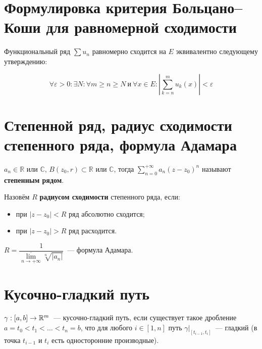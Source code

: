 \documentclass{article}
\begin{document}
    \newpage
    
    \section{Формулировка критерия Больцано--Коши для равномерной сходимости}
    
        Функциональный ряд $\sum u_n$ равномерно сходится на $E$ эквивалентно следующему утверждению:
        
        $$\forall \varepsilon > 0 : \exists N : \forall m \geq n \geq N \ \textrm{и} \ \forall x \in E : \left| \sum\limits^m_{k = n} u_k(x) \right| < \varepsilon$$
        
    \newpage
    
    \section{Степенной ряд, радиус сходимости степенного ряда, формула Адамара}
    
        $a_n \in \mathbb{R}$ или $\mathbb{C}$, $B(z_0, r) \subset \mathbb{R}$ или $\mathbb{C}$, тогда $\sum\limits^{+\infty}_{n = 0} a_n (z - z_0)^n$ называют \textbf{степенным рядом}.
        
        Назовём $R$ \textbf{радиусом сходимости} степенного ряда, если:
        
            \begin{itemize}
            
                \item при $|z - z_0| < R$ ряд абсолютно сходится;
                
                \item при $|z - z_0| > R$ ряд расходится.
                
            \end{itemize}
        
        $R = \dfrac{1}{\overline{\lim\limits_{n \rightarrow +\infty}} \sqrt[n]{|a_n|}}$~--- формула Адамара.
    
    \newpage
    
    \section{Кусочно-гладкий путь}
    
        $\gamma : [a, b] \rightarrow \mathbb{R}^m$~--- кусочно-гладкий путь, если существует такое дробление $a = t_0 < t_1 < \ldots < t_n = b$, что для любого $i \in [1, n]$ путь $\gamma \big|_{[t_{i - 1}, t_i]}$~--- гладкий (в точка $t_{i - 1}$ и $t_i$ есть односторонние производные).
        
\end{document}
